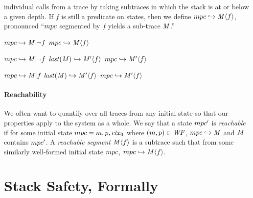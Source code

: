 \documentclass[acmsmall,review,anonymous]{acmart}\settopmatter{printfolios=true,printccs=false,printacmref=false}
\begin{document}
individual calls from a trace by taking subtraces in which the stack is
at or below a given depth. If \(f\) is still a predicate on states, then
we define \(mpc \hookrightarrow \mathit{M} \langle f \rangle\), pronounced
``\(mpc\) segmented by \(f\) yields a sub-trace \(\mathit{M}\).''

\begin{center}
\begin{minipage}{.38\textwidth}
              {\(mpc \hookrightarrow \mathit{M} | \neg f\)}
              {\(mpc \hookrightarrow \mathit{M} \langle f \rangle\)}
\end{minipage}
%
\begin{minipage}{.58\textwidth}
                {\(mpc \hookrightarrow \mathit{M} | \neg f\)}
                {\(\mathit{last}(\mathit{M}) \hookrightarrow \mathit{M}' \langle f \rangle\)}
                {\(mpc \hookrightarrow \mathit{M}' \langle f \rangle\)}
\end{minipage}
%
                {\(mpc \hookrightarrow \mathit{M} | f\)}
                {\(\mathit{last}(\mathit{M}) \hookrightarrow \mathit{M}' \langle f \rangle\)}
                {\(mpc \hookrightarrow \mathit{M}' \langle f \rangle\)}
\end{center}

\paragraph*{Reachability}

We often want to quantify over all traces from any initial state so that our
properties apply to the system as a whole. We say that a state \(mpc'\)
is {\em reachable} if for some initial state \(mpc = m,p,\mathit{ctx}_0\)
where \((m,p) \in \mathit{WF}\), \(mpc \hookrightarrow \mathit{M}\)
and \(\mathit{M}\) contains \(mpc'\). A {\it reachable segment} \(\mathit{M} \langle f \rangle\) is a subtrace
such that from some similarly well-formed initial state \(mpc\),
\(mpc \hookrightarrow \mathit{M} \langle f \rangle\).

\section{Stack Safety, Formally}
\label{sec:lse}
\end{document}

